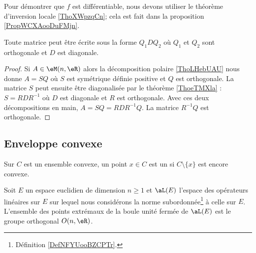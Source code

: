 \begin{remark}  \label{RemBJCBooGLiRmG}
    Pour démontrer que \( f\) est différentiable, nous devons utiliser le théorème d'inversion locale \ref{ThoXWpzqCn}; cela est fait dans la proposition \ref{PropWCXAooDuFMjn}.
\end{remark}

\begin{corollary}       \label{CorAWYBooNCCQSf}
    Toute matrice peut être écrite sous la forme \( Q_1DQ_2\) où \( Q_1\) et \( Q_2\) sont orthogonale et \( D\) est diagonale.
\end{corollary}

\begin{proof}
    Si \( A\in\eM(n,\eR)\) alors la décomposition polaire \ref{ThoLHebUAU} nous donne \( A=SQ\) où \( S\) est symétrique définie positive et \( Q\) est orthogonale. La matrice \( S\) peut ensuite être diagonalisée par le théorème \ref{ThoeTMXla} : \( S=RDR^{-1}\) où \( D\) est diagonale et \( R\) est orthogonale. Avec ces deux décompositions en main, \( A=SQ=RDR^{-1}Q\). La matrice \( R^{-1}Q\) est orthogonale.
\end{proof}

\subsection{Enveloppe convexe}

\begin{definition}
    Sur \( C\) est un ensemble convexe, un point \( x\in C\) est un  si \( C\setminus\{ x \}\) est encore convexe.
\end{definition}

\begin{theorem} \label{ThoBALmoQw}
    Soit \( E\) un espace euclidien de dimension \( n\geq 1\) et \( \aL(E)\) l'espace des opérateurs linéaires sur \( E\) sur lequel nous considérons la norme subordonnée\footnote{Définition \ref{DefNFYUooBZCPTr}.} à celle sur \( E\). L'ensemble des points extrémaux de la boule unité fermée de \( \aL(E)\) est le groupe orthogonal \( O(n,\eR)\).
\end{theorem}

